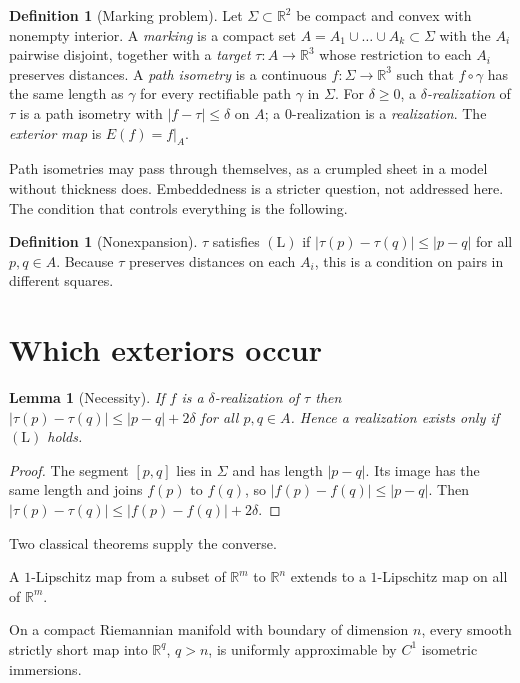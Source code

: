 \documentclass[11pt]{article}
\newtheorem{lemma}[theorem]{Lemma}
\theoremstyle{definition}
\newtheorem{definition}[theorem]{Definition}
\theoremstyle{remark}
\begin{document}
\begin{definition}[Marking problem]\label{def:marking}
Let $\Sigma\subset\mathbb R^2$ be compact and convex with nonempty interior. A \emph{marking} is a compact set $A=A_1\cup\dots\cup A_k\subset\Sigma$ with the $A_i$ pairwise disjoint, together with a \emph{target} $\tau:A\to\mathbb R^3$ whose restriction to each $A_i$ preserves distances. A \emph{path isometry} is a continuous $f:\Sigma\to\mathbb R^3$ such that $f\circ\gamma$ has the same length as $\gamma$ for every rectifiable path $\gamma$ in $\Sigma$. For $\delta\ge0$, a \emph{$\delta$-realization} of $\tau$ is a path isometry with $|f-\tau|\le\delta$ on $A$; a $0$-realization is a \emph{realization}. The \emph{exterior map} is $E(f)=f|_A$.
\end{definition}

Path isometries may pass through themselves, as a crumpled sheet in a model without thickness does. Embeddedness is a stricter question, not addressed here. The condition that controls everything is the following.

\begin{definition}[Nonexpansion]\label{def:L}
$\tau$ satisfies $(\mathrm L)$ if $|\tau(p)-\tau(q)|\le|p-q|$ for all $p,q\in A$. Because $\tau$ preserves distances on each $A_i$, this is a condition on pairs in different squares.
\end{definition}

\section{Which exteriors occur}

\begin{lemma}[Necessity]\label{lem:nec}
If $f$ is a $\delta$-realization of $\tau$ then $|\tau(p)-\tau(q)|\le|p-q|+2\delta$ for all $p,q\in A$. Hence a realization exists only if $(\mathrm L)$ holds.
\end{lemma}

\begin{proof}
The segment $[p,q]$ lies in $\Sigma$ and has length $|p-q|$. Its image has the same length and joins $f(p)$ to $f(q)$, so $|f(p)-f(q)|\le|p-q|$. Then $|\tau(p)-\tau(q)|\le|f(p)-f(q)|+2\delta$.
\end{proof}

Two classical theorems supply the converse.

\begin{description}[leftmargin=1.2em,itemsep=2pt]
\item[Kirszbraun \cite{kirszbraun1934}.] A $1$-Lipschitz map from a subset of $\mathbb R^m$ to $\mathbb R^n$ extends to a $1$-Lipschitz map on all of $\mathbb R^m$.
\item[Nash--Kuiper, in Gromov's form \cite{nash1954,kuiper1955,eliashbergmishachev2002}.] On a compact Riemannian manifold with boundary of dimension $n$, every smooth strictly short map into $\mathbb R^q$, $q>n$, is uniformly approximable by $C^1$ isometric immersions.
\end{description}
\end{document}
